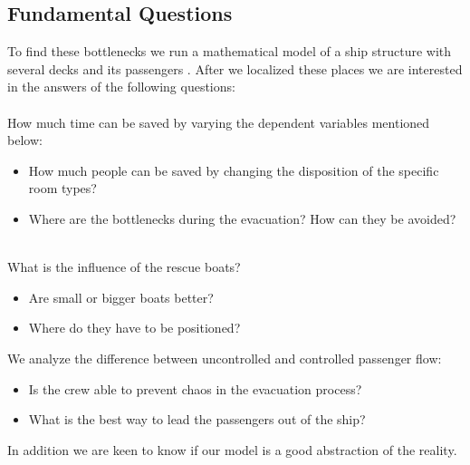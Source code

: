\documentclass[11pt]{article}
\begin{document}
\subsection{Fundamental Questions}
To find these bottlenecks we run a mathematical model of a ship structure  with several decks and its passengers \cite{shipdecks}. After we localized these places we are interested in the answers of the following questions:\\\\

\newpage
How much time can be saved by varying the dependent variables mentioned below:
\begin{itemize}
\item How much people can be saved by changing the disposition of the specific room types?
\item Where are the bottlenecks during the evacuation? How can they be avoided?\\\\
\end{itemize}
What is the influence of the rescue boats?
\begin{itemize}
\item Are small or bigger boats better?
\item Where do they have to be positioned?
\end{itemize}
We analyze the difference between uncontrolled and controlled passenger flow:
\begin{itemize}
\item Is the crew able to prevent chaos in the evacuation process?
\item What is the best way to lead the passengers out of the ship?
\end{itemize}
In addition we are keen to know if our model is a good abstraction of the reality.
\end{document}
